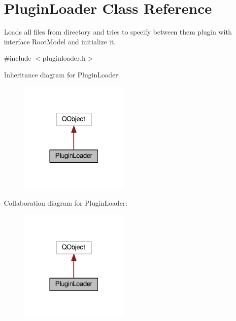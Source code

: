 \hypertarget{class_plugin_loader}{}\section{Plugin\+Loader Class Reference}
\label{class_plugin_loader}


Loads all files from directory and tries to specify between them plugin with interface Root\+Model and initialize it.  




{\ttfamily \#include $<$pluginloader.\+h$>$}



Inheritance diagram for Plugin\+Loader\+:\nopagebreak
\begin{figure}[H]
\begin{center}
\leavevmode
\includegraphics[width=153pt]{class_plugin_loader__inherit__graph}
\end{center}
\end{figure}


Collaboration diagram for Plugin\+Loader\+:\nopagebreak
\begin{figure}[H]
\begin{center}
\leavevmode
\includegraphics[width=153pt]{class_plugin_loader__coll__graph}
\end{center}
\end{figure}
